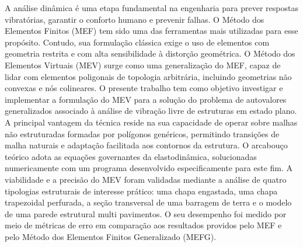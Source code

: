 \begin{resumo}

\noindent A análise dinâmica é uma etapa fundamental na engenharia para prever respostas vibratórias, garantir o conforto humano e prevenir falhas. O Método dos Elementos Finitos (MEF) tem sido uma das ferramentas mais utilizadas para esse propósito. Contudo, sua formulação clássica exige o uso de elementos com geometria restrita e com alta sensibilidade à distorção geométrica. O Método dos Elementos Virtuais (MEV) surge como uma generalização do MEF, capaz de lidar com elementos poligonais de topologia arbitrária, incluindo geometrias não convexas e nós colineares. O presente trabalho tem como objetivo investigar e implementar a formulação do MEV para a solução do problema de autovalores generalizados associado à análise de vibração livre de estruturas em estado plano. A principal vantagem da técnica reside na sua capacidade de operar sobre malhas não estruturadas formadas por polígonos genéricos, permitindo transições de malha naturais e adaptação facilitada aos contornos da estrutura. O arcabouço teórico adota as equações governantes da elastodinâmica, solucionadas numericamente com um programa desenvolvido especificamente para este fim. A viabilidade e a precisão do MEV foram validadas mediante a análise de quatro tipologias estruturais de interesse prático: uma chapa engastada, uma chapa trapezoidal perfurada, a seção transversal de uma barragem de terra e o modelo de uma parede estrutural multi pavimentos. O seu desempenho foi medido por meio de métricas de erro em comparação aos resultados providos pelo MEF e pelo Método dos Elementos Finitos Generalizado (MEFG).

\end{resumo}
